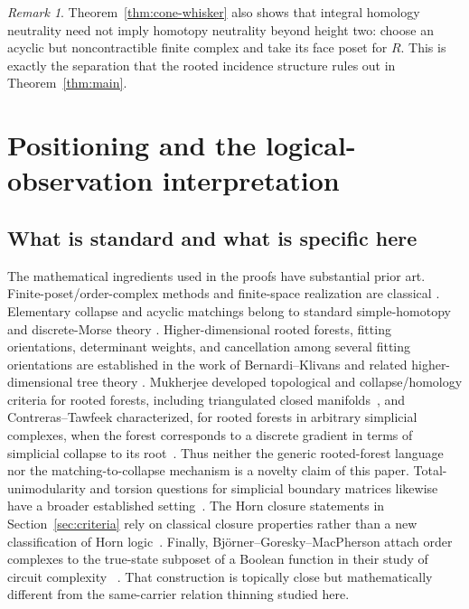 \documentclass[11pt]{article}
\theoremstyle{definition}
\theoremstyle{remark}
\newtheorem{remark}[theorem]{Remark}
\begin{document}
\begin{remark}
Theorem~\ref{thm:cone-whisker} also shows that integral homology neutrality need not
imply homotopy neutrality beyond height two: choose an acyclic but noncontractible
finite complex and take its face poset for $R$.  This is exactly the separation that
the rooted incidence structure rules out in Theorem~\ref{thm:main}.
\end{remark}

\section{Positioning and the logical-observation interpretation}\label{sec:logical}

\subsection{What is standard and what is specific here}

The mathematical ingredients used in the proofs have substantial prior art.
Finite-poset/order-complex methods and finite-space realization are classical
\cite{McCord1966,Barmak2011A,BarmakBook}.  Elementary collapse and acyclic matchings
belong to standard simple-homotopy and discrete-Morse theory
\cite{Forman1998,Kozlov2008}.  Higher-dimensional rooted forests, fitting orientations,
determinant weights, and cancellation among several fitting orientations are established
in the work of Bernardi--Klivans and related higher-dimensional tree theory
\cite{BernardiKlivans2016,DuvalKlivansMartin2016}.  Mukherjee developed topological and collapse/homology criteria for rooted forests,
including triangulated closed manifolds~\cite{Mukherjee2018,Mukherjee2020}, and
Contreras--Tawfeek characterized, for rooted forests in arbitrary simplicial complexes,
when the forest corresponds to a discrete gradient in terms of simplicial collapse to
its root~\cite{ContrerasTawfeek2024}.  Thus neither the generic rooted-forest language
nor the matching-to-collapse mechanism is a novelty claim of this paper.
Total-unimodularity and torsion questions for simplicial boundary matrices likewise
have a broader established setting~\cite{DeyHiraniKrishnamoorthy2011}.  The Horn
closure statements in Section~\ref{sec:criteria} rely on classical closure properties
rather than a new classification of Horn logic~\cite{JeavonsCohenGyssens1997,Wild2017}.
Finally, Bj\"orner--Goresky--MacPherson attach order complexes to the true-state
subposet of a Boolean function in their study of circuit complexity
~\cite{BjornerGoreskyMacPherson2024}.  That construction is topically close but
mathematically different from the same-carrier relation thinning studied here.
\end{document}
